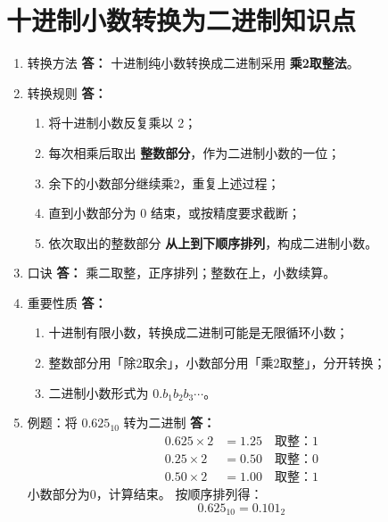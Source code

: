 \documentclass{article}
\begin{document}
\section{十进制小数转换为二进制知识点}
\begin{enumerate}[label=\arabic*.]
\item 转换方法
\textbf{答：}
十进制纯小数转换成二进制采用 \textbf{乘2取整法}。

\item 转换规则
\textbf{答：}
\begin{enumerate}[label=(\arabic*)]
    \item 将十进制小数反复乘以 2；
    \item 每次相乘后取出 \textbf{整数部分}，作为二进制小数的一位；
    \item 余下的小数部分继续乘2，重复上述过程；
    \item 直到小数部分为 0 结束，或按精度要求截断；
    \item 依次取出的整数部分 \textbf{从上到下顺序排列}，构成二进制小数。
\end{enumerate}

\item 口诀
\textbf{答：}
乘二取整，正序排列；整数在上，小数续算。

\item 重要性质
\textbf{答：}
\begin{enumerate}[label=(\arabic*)]
    \item 十进制有限小数，转换成二进制可能是无限循环小数；
    \item 整数部分用「除2取余」，小数部分用「乘2取整」，分开转换；
    \item 二进制小数形式为 $0.b_1b_2b_3\cdots$。
\end{enumerate}

\item 例题：将 $0.625_{10}$ 转为二进制
\textbf{答：}
\[
\begin{aligned}
0.625 \times 2 &= 1.25 \quad \text{取整：}1\\
0.25 \times 2  &= 0.50 \quad \text{取整：}0\\
0.50 \times 2  &= 1.00 \quad \text{取整：}1
\end{aligned}
\]
小数部分为0，计算结束。
按顺序排列得：
\[
0.625_{10} = 0.101_2
\]
\end{enumerate}
\end{document}
